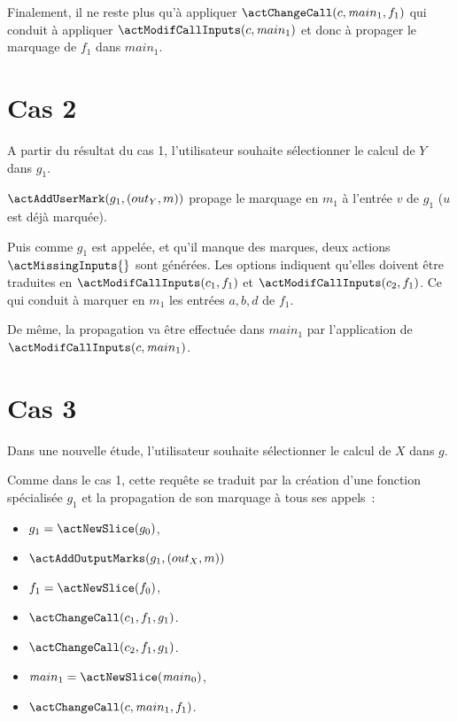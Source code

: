 \bb

Finalement, il ne reste plus qu'à appliquer $\actChangeCall(c, {\mathit main}_1,
f_1)$ qui conduit à appliquer $\actModifCallInputs(c, {\mathit main}_1)$
et donc à propager le marquage de $f_1$ dans ${\mathit main}_1$.



\section{Cas 2}

A partir du résultat du cas 1, l'utilisateur souhaite sélectionner le calcul de
$Y$ dans $g_1$. \bb

$\actAddUserMark(g_1, (out_Y, m))$ propage le marquage en $m_1$ à l'entrée $v$
de $g_1$ ($u$ est déjà marquée).

\bb

Puis comme $g_1$ est appelée, et qu'il manque des marques, deux actions
$\actMissingInputs{}$ sont générées. Les options indiquent qu'elles doivent être
traduites en $\actModifCallInputs(c_1, f_1)$ et $\actModifCallInputs(c_2, f_1)$.
Ce qui conduit à marquer en $m_1$ les entrées $a, b, d$ de $f_1$.

\bb

De même, la propagation va être effectuée dans ${\mathit main}_1$
par l'application de $\actModifCallInputs(c, {\mathit main}_1)$.

\bb


\section{Cas 3}

Dans une nouvelle étude, l'utilisateur souhaite sélectionner le calcul de $X$
dans $g$.
\bb

Comme dans le cas 1, cette requête se traduit par la création d'une fonction
spécialisée $g_1$ et la propagation de son marquage à tous ses appels~:
\begin{itemize}
  \item $g_1 = \actNewSlice (g_0)$,
  \item $\actAddOutputMarks(g_1, (out_X, m))$
  \item $f_1 = \actNewSlice (f_0)$,
  \item $\actChangeCall(c_1, f_1, g_1)$.
  \item $\actChangeCall(c_2, f_1, g_1)$.
  \item ${\mathit main}_1 = \actNewSlice ({\mathit main}_0)$,
  \item $\actChangeCall(c, {\mathit main}_1, f_1)$.
\end{itemize}

